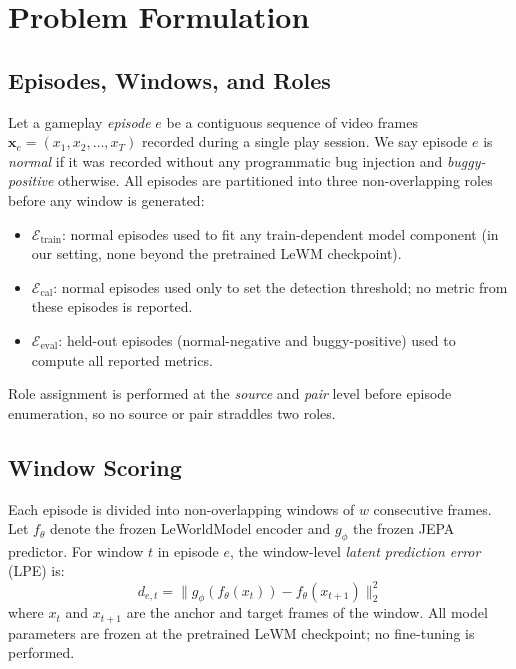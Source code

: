 \section{Problem Formulation}
\label{sec:problem}

\subsection{Episodes, Windows, and Roles}

Let a gameplay \emph{episode} $e$ be a contiguous sequence of video frames
$\mathbf{x}_e = (x_1, x_2, \ldots, x_T)$ recorded during a single play session.
We say episode $e$ is \emph{normal} if it was recorded without any programmatic bug injection
and \emph{buggy-positive} otherwise.
All episodes are partitioned into three non-overlapping roles before any window is generated:
\begin{itemize}
  \item $\mathcal{E}_{\text{train}}$: normal episodes used to fit any train-dependent model
  component (in our setting, none beyond the pretrained LeWM checkpoint).
  \item $\mathcal{E}_{\text{cal}}$: normal episodes used only to set the detection threshold;
  no metric from these episodes is reported.
  \item $\mathcal{E}_{\text{eval}}$: held-out episodes (normal-negative and buggy-positive)
  used to compute all reported metrics.
\end{itemize}
Role assignment is performed at the \emph{source} and \emph{pair} level before episode
enumeration, so no source or pair straddles two roles.

\subsection{Window Scoring}

Each episode is divided into non-overlapping windows of $w$ consecutive frames.
Let $f_\theta$ denote the frozen LeWorldModel encoder and $g_\phi$ the frozen JEPA predictor.
For window $t$ in episode $e$, the window-level \emph{latent prediction error} (LPE) is:
\begin{equation}
  d_{e,t} = \bigl\| g_\phi(f_\theta(x_t)) - f_\theta(x_{t+1}) \bigr\|_2^2
  \label{eq:lpe}
\end{equation}
where $x_t$ and $x_{t+1}$ are the anchor and target frames of the window.
All model parameters are frozen at the pretrained LeWM checkpoint; no fine-tuning is performed.

